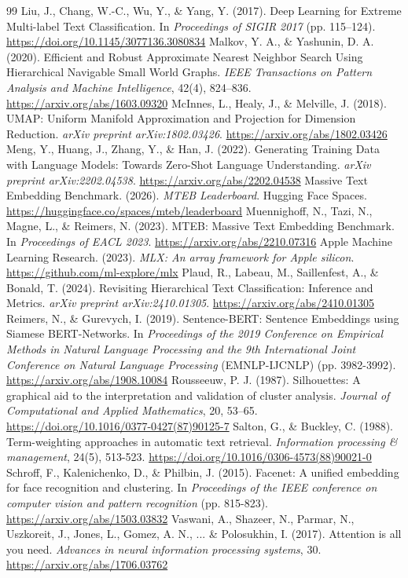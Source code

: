 \documentclass[12pt,a4paper]{report}
\begin{document}
\begin{thebibliography}{99}
     Liu, J., Chang, W.-C., Wu, Y., \& Yang, Y. (2017). Deep Learning for Extreme Multi-label Text Classification. In \textit{Proceedings of SIGIR 2017} (pp. 115--124). \url{https://doi.org/10.1145/3077136.3080834}
     Malkov, Y. A., \& Yashunin, D. A. (2020). Efficient and Robust Approximate Nearest Neighbor Search Using Hierarchical Navigable Small World Graphs. \textit{IEEE Transactions on Pattern Analysis and Machine Intelligence}, 42(4), 824--836. \url{https://arxiv.org/abs/1603.09320}
     McInnes, L., Healy, J., \& Melville, J. (2018). UMAP: Uniform Manifold Approximation and Projection for Dimension Reduction. \textit{arXiv preprint arXiv:1802.03426}. \url{https://arxiv.org/abs/1802.03426}
     Meng, Y., Huang, J., Zhang, Y., \& Han, J. (2022). Generating Training Data with Language Models: Towards Zero-Shot Language Understanding. \textit{arXiv preprint arXiv:2202.04538}. \url{https://arxiv.org/abs/2202.04538}
     Massive Text Embedding Benchmark. (2026). \textit{MTEB Leaderboard}. Hugging Face Spaces. \url{https://huggingface.co/spaces/mteb/leaderboard}
     Muennighoff, N., Tazi, N., Magne, L., \& Reimers, N. (2023). MTEB: Massive Text Embedding Benchmark. In \textit{Proceedings of EACL 2023}. \url{https://arxiv.org/abs/2210.07316}
     Apple Machine Learning Research. (2023). \textit{MLX: An array framework for Apple silicon}. \url{https://github.com/ml-explore/mlx}
     Plaud, R., Labeau, M., Saillenfest, A., \& Bonald, T. (2024). Revisiting Hierarchical Text Classification: Inference and Metrics. \textit{arXiv preprint arXiv:2410.01305}. \url{https://arxiv.org/abs/2410.01305}
     Reimers, N., \& Gurevych, I. (2019). Sentence-BERT: Sentence Embeddings using Siamese BERT-Networks. In \textit{Proceedings of the 2019 Conference on Empirical Methods in Natural Language Processing and the 9th International Joint Conference on Natural Language Processing} (EMNLP-IJCNLP) (pp. 3982-3992). \url{https://arxiv.org/abs/1908.10084}
     Rousseeuw, P. J. (1987). Silhouettes: A graphical aid to the interpretation and validation of cluster analysis. \textit{Journal of Computational and Applied Mathematics}, 20, 53--65. \url{https://doi.org/10.1016/0377-0427(87)90125-7}
     Salton, G., \& Buckley, C. (1988). Term-weighting approaches in automatic text retrieval. \textit{Information processing \& management}, 24(5), 513-523. \url{https://doi.org/10.1016/0306-4573(88)90021-0}
     Schroff, F., Kalenichenko, D., \& Philbin, J. (2015). Facenet: A unified embedding for face recognition and clustering. In \textit{Proceedings of the IEEE conference on computer vision and pattern recognition} (pp. 815-823). \url{https://arxiv.org/abs/1503.03832}
     Vaswani, A., Shazeer, N., Parmar, N., Uszkoreit, J., Jones, L., Gomez, A. N., ... \& Polosukhin, I. (2017). Attention is all you need. \textit{Advances in neural information processing systems}, 30. \url{https://arxiv.org/abs/1706.03762}
\end{thebibliography}
\end{document}
